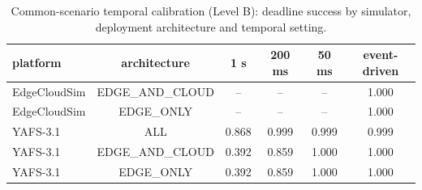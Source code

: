 \begin{table}
\centering
\footnotesize
\caption{Common-scenario temporal calibration (Level B): deadline success by simulator, deployment architecture and temporal setting.}
\label{tab:common-level-b}
\begin{tabular}{lccccc}
\toprule
platform & architecture & 1 s & 200 ms & 50 ms & event-driven \\
\midrule
EdgeCloudSim & EDGE\_AND\_CLOUD & -- & -- & -- & 1.000 \\
EdgeCloudSim & EDGE\_ONLY & -- & -- & -- & 1.000 \\
YAFS-3.1 & ALL & 0.868 & 0.999 & 0.999 & 0.999 \\
YAFS-3.1 & EDGE\_AND\_CLOUD & 0.392 & 0.859 & 1.000 & 1.000 \\
YAFS-3.1 & EDGE\_ONLY & 0.392 & 0.859 & 1.000 & 1.000 \\
\bottomrule
\end{tabular}
\par\vspace{2pt}{\footnotesize\raggedright Each cell is the mean of seed-level success ratios over the shared P1-CBS trace. Only adapters that have been executed appear; a blank cell is not a zero.\par}
\end{table}
